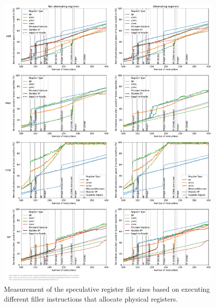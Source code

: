 \begin{figure}[]
    \centering
    \includegraphics[width=\columnwidth]{fig/robsize/register-files.pdf}
    \caption{\label{fig:robsize-registers}Measurement of the speculative register file sizes based on executing different filler instructions that allocate physical registers.}
\end{figure}

